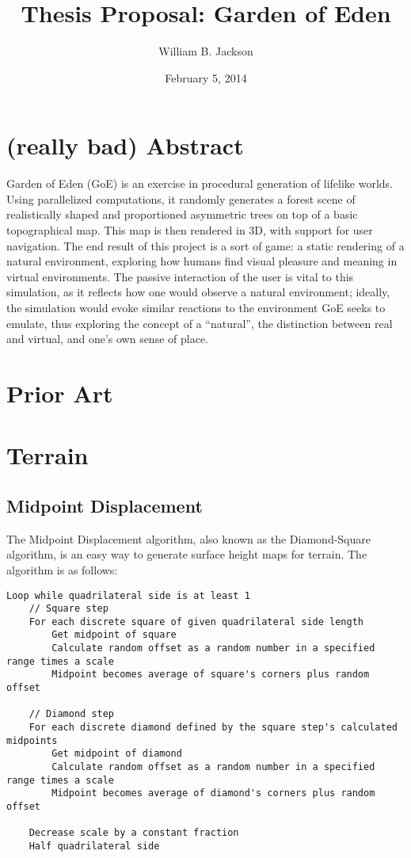 \documentclass{article}
\title{Thesis Proposal: Garden of Eden}
\author{William B. Jackson}
\date{February 5, 2014}
\newcommand{\tab}{\hspace*{2em}}
\begin{document}
    \maketitle
    \section{(really bad) Abstract} %
    \tab Garden of Eden (GoE) is an exercise in procedural generation of lifelike worlds. Using
parallelized computations, it randomly generates a forest scene of realistically shaped and
proportioned asymmetric trees on top of a basic topographical map. This map is then rendered in 3D,
with support for user navigation. The end result of this project is a sort of game: a static
rendering of a natural environment, exploring how humans find visual pleasure and meaning in virtual
environments. The passive interaction of the user is vital to this simulation, as it reflects how
one would observe a natural environment; ideally, the simulation would evoke similar reactions to
the environment GoE seeks to emulate, thus exploring the concept of a “natural”, the distinction
between real and virtual, and one's own sense of place.
 

    \section{Prior Art}

    \section{Terrain}
        \subsection{Midpoint Displacement}
\tab The Midpoint Displacement algorithm, also known as the Diamond-Square algorithm, is an easy
way to generate surface height maps for terrain. The algorithm is as follows:
    \begin{verbatim}
Loop while quadrilateral side is at least 1
    // Square step
    For each discrete square of given quadrilateral side length
        Get midpoint of square
        Calculate random offset as a random number in a specified range times a scale
        Midpoint becomes average of square's corners plus random offset

    // Diamond step
    For each discrete diamond defined by the square step's calculated midpoints
        Get midpoint of diamond
        Calculate random offset as a random number in a specified range times a scale
        Midpoint becomes average of diamond's corners plus random offset

    Decrease scale by a constant fraction
    Half quadrilateral side

    \end{verbatim}
\end{document}
